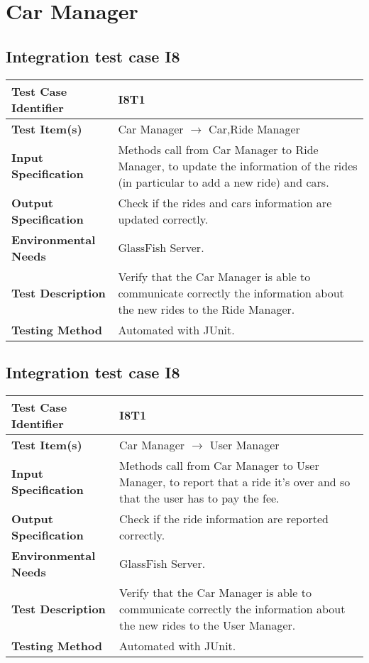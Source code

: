 \section{Car Manager}
\subsection{Integration test case I8}
\begin{tabular}{l p{}}
    \hline
    \textbf{Test Case Identifier} & I8T1\\
    \hline
    \textbf{Test Item(s)} & Car Manager $\rightarrow$ Car,Ride Manager\\
    \hline
    \textbf{Input Specification} & Methods call from Car Manager to Ride Manager, to update the information of the rides (in particular to add a new ride) and cars.\\
    \hline
    \textbf{Output Specification} & Check if the rides and cars information are updated correctly.\\
    \hline
    \textbf{Environmental Needs} & GlassFish Server.\\
    \hline
    \textbf{Test Description} & Verify that the Car Manager is able to communicate correctly the information about the new rides to the Ride Manager.\\
    \hline
    \textbf{Testing Method} & Automated with JUnit.\\
    \hline
\end{tabular}

\subsection{Integration test case I8}

\begin{tabular}{l p{}}
    \hline
    \textbf{Test Case Identifier} & I8T1\\
    \hline
    \textbf{Test Item(s)} & Car Manager $\rightarrow$ User Manager\\
    \hline
    \textbf{Input Specification} & Methods call from Car Manager to User Manager, to report that a ride it's over and so that the user has to pay the fee.\\
    \hline
    \textbf{Output Specification} & Check if the ride information are reported correctly.\\
    \hline
    \textbf{Environmental Needs} & GlassFish Server.\\
    \hline
    \textbf{Test Description} & Verify that the Car Manager is able to communicate correctly the information about the new rides to the User Manager.\\
    \hline
    \textbf{Testing Method} & Automated with JUnit.\\
    \hline
\end{tabular}